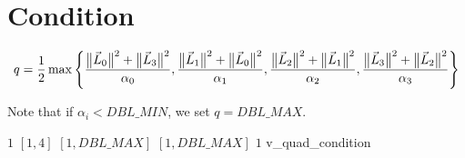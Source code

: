 \section{Condition}

\[
q = \frac{1}{2} \max \left\{  \frac {\big\lVert{\vec L_0}\big\rVert^2 + \big\lVert{\vec L_3}\big\rVert^2 } { \alpha_0 },
                        \frac {\big\lVert{\vec L_1}\big\rVert^2 + \big\lVert{\vec L_0}\big\rVert^2 } { \alpha_1 },
                        \frac {\big\lVert{\vec L_2}\big\rVert^2 + \big\lVert{\vec L_1}\big\rVert^2 } { \alpha_2 },
                        \frac {\big\lVert{\vec L_3}\big\rVert^2 + \big\lVert{\vec L_2}\big\rVert^2 } { \alpha_3 } 
                \right\}
\]

Note that if $\alpha_i< DBL\_MIN$, we set $q = DBL\_MAX$.

%
{$1$}%
{$[1,4]$}%
{$[1,DBL\_MAX]$}%
{$[1,DBL\_MAX]$}%
{$1$}%
{\cite{knu:00}}%
{v\_quad\_condition}%

